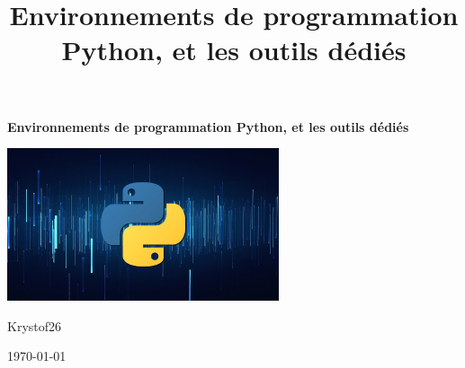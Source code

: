 \documentclass[a4paper,12pt]{book}
\title{Environnements de programmation Python, et les outils dédiés}
\begin{document}
\begin{titlepage}
    \begin{center}
        \vspace*{1cm}

        \begin{mdframed}[
            backgroundcolor=gray!35,
            linewidth=1.5pt,
            roundcorner=6pt,
        ]
            \centering
            \vspace*{1cm}

            \textbf{\Huge {}\selectfont Environnements de programmation Python, et les outils dédiés}

            \vspace*{2cm}

            \includegraphics[width=0.6\textwidth]{IMG/python-logo.png} %

            \vspace*{8cm}

            \Large Krystof26

            \vspace*{0.5cm}

            \Large \today

            \vspace*{1cm}
        \end{mdframed}

    \end{center}
\end{titlepage}




\tableofcontents



\end{document}
